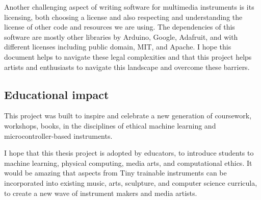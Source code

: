Another challenging aspect of writing software for multimedia instruments is its licensing, both choosing a license and also respecting and understanding the license of other code and resources we are using. The dependencies of this software are mostly other libraries by Arduino, Google, Adafruit, and with different licenses including public domain, MIT, and Apache. I hope this document helps to navigate these legal complexities and that this project helps artists and enthusiasts to navigate this landscape and overcome these barriers.

\subsection{Educational impact}

This project was built to inspire and celebrate a new generation of coursework, workshops, books, in the disciplines of ethical machine learning and microcontroller-based instruments.

I hope that this thesis project is adopted by educators, to introduce students to machine learning, physical computing, media arts, and computational ethics. It would be amazing that aspects from Tiny trainable instruments can be incorporated into existing music, arts, sculpture, and computer science curricula, to create a new wave of instrument makers and media artists.
